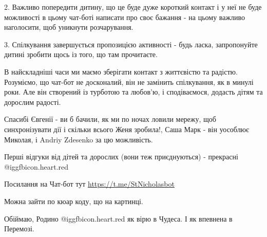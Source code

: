 2. Важливо попередити дитину, що це буде дуже короткий контакт і у неї не буде
можливості в цьому чат-боті написати про своє бажання - на цьому важливо
наголосити, щоб уникнути розчарування. 

3. Спілкування завершується пропозицією активності - будь ласка, запропонуйте
дитині зробити щось із того, що там прочитаєте. 

В найскладніші часи ми маємо зберігати контакт з життєвістю та радістю.
Розуміємо, що чат-бот не досконалий, він не замінить спілкування, як в минулі
роки. Але він створений із турботою та любов'ю, і сподіваємося, додасть дітям
та дорослим радості. 

Спасибі Євгенії - ви б бачили, як ми по ночах ловили мережу, щоб синхронізувати
дії і скільки всього Женя зробила!, Саша Марк  - він уособлює Миколая, і Andriy
Zdesenko  за цю можливість. 

Перші відгуки від дітей та дорослих (вони теж приєднуються) - прекрасні
@igg{fbicon.heart.red}

Посилання на Чат-бот тут \url{https://t.me/StNicholasbot}

Можна зайти по кюар коду, що на картинці. 

Обіймаю, Родино @igg{fbicon.heart.red} як вірю в Чудеса. І як впевнена в
Перемозі.


